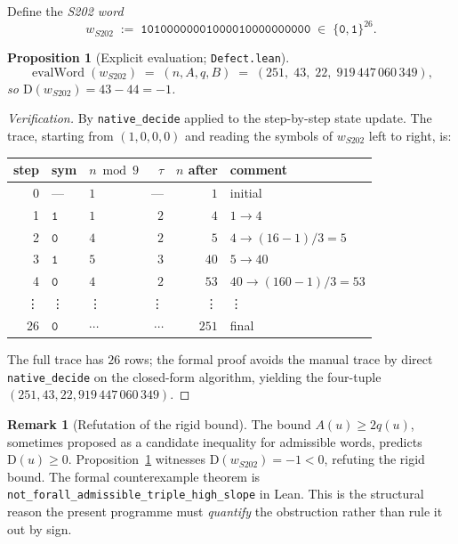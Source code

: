 \documentclass[11pt,a4paper]{article}
\theoremstyle{plain}
\newtheorem{proposition}[theorem]{Proposition}
\theoremstyle{definition}
\newtheorem{remark}[theorem]{Remark}
\newcommand{\wS}{w_{S202}}
\newcommand{\defect}{\mathrm{D}}
\DeclareMathOperator{\evalWord}{evalWord}
\begin{document}
Define the \emph{S202 word}
\[
  \wS \;:=\; \mathtt{10100000001000010000000000} \;\in\; \{\mathtt{0}, \mathtt{1}\}^{26}.
\]

\begin{proposition}[Explicit evaluation; \texttt{Defect.lean}]
\label{prop:s202-evaluation}
\[
  \evalWord(\wS) \;=\; (n, A, q, B) \;=\;
    (251,\; 43,\; 22,\; 919\,447\,060\,349),
\]
so $\defect(\wS) = 43 - 44 = -1$.
\end{proposition}

\begin{proof}[Verification]
By \texttt{native\_decide} applied to the step-by-step state
update. The trace, starting from $(1, 0, 0, 0)$ and reading the
symbols of $\wS$ left to right, is:
\begin{center}\small
\begin{tabular}{rllrrl}
\toprule
step & sym & $n \bmod 9$ & $\tau$ & $n$ after & comment \\
\midrule
0  & ---           & $1$ & ---   & $1$ & initial \\
1  & $\mathtt{1}$  & $1$ & $2$   & $4$ & $1 \to 4$ \\
2  & $\mathtt{0}$  & $4$ & $2$   & $5$ & $4 \to (16-1)/3 = 5$ \\
3  & $\mathtt{1}$  & $5$ & $3$   & $40$ & $5 \to 40$ \\
4  & $\mathtt{0}$  & $4$ & $2$   & $53$ & $40 \to (160-1)/3 = 53$ \\
\vdots & \vdots    & \vdots & \vdots & \vdots & \vdots \\
26 & $\mathtt{0}$  & $\cdots$ & $\cdots$ & $251$ & final\\
\bottomrule
\end{tabular}
\end{center}
The full trace has $26$ rows; the formal proof avoids the manual
trace by direct \texttt{native\_decide} on the closed-form
algorithm, yielding the four-tuple $(251, 43, 22, 919\,447\,060\,349)$.
\end{proof}

\begin{remark}[Refutation of the rigid bound]
The bound $A(u) \ge 2 q(u)$, sometimes proposed as a candidate
inequality for admissible words, predicts $\defect(u) \ge 0$.
Proposition~\ref{prop:s202-evaluation} witnesses
$\defect(\wS) = -1 < 0$, refuting the rigid bound. The formal
counterexample theorem is
\texttt{not\_forall\_admissible\_triple\_high\_slope} in Lean.
This is the structural reason the present programme must
\emph{quantify} the obstruction rather than rule it out by sign.
\end{remark}
\end{document}
